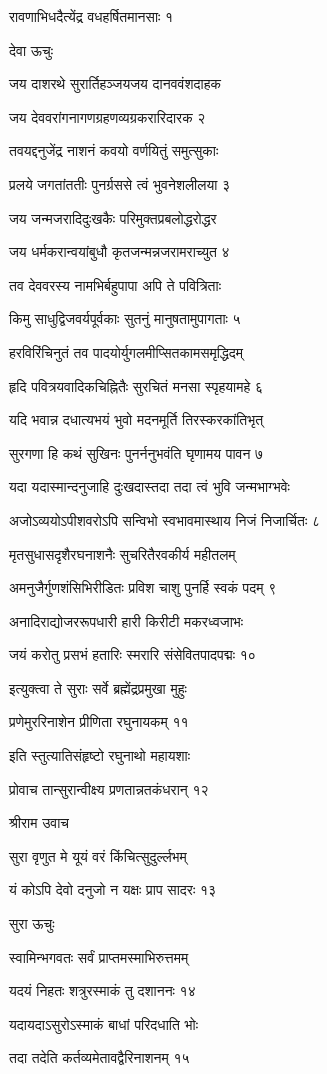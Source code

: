रावणाभिधदैत्येंद्र वधहर्षितमानसाः १

देवा ऊचुः

जय दाशरथे सुरार्तिहञ्जयजय दानववंशदाहक

जय देववरांगनागणग्रहणव्यग्रकरारिदारक २

तवयद्दनुजेंद्र नाशनं कवयो वर्णयितुं समुत्सुकाः

प्रलये जगतांततीः पुनर्ग्रससे त्वं भुवनेशलीलया ३

जय जन्मजरादिदुःखकैः परिमुक्तप्रबलोद्धरोद्धर

जय धर्मकरान्वयांबुधौ कृतजन्मन्नजरामराच्युत ४

तव देववरस्य नामभिर्बहुपापा अपि ते पवित्रिताः

किमु साधुद्विजवर्यपूर्वकाः सुतनुं मानुषतामुपागताः ५

हरविरिंचिनुतं तव पादयोर्युगलमीप्सितकामसमृद्धिदम्

हृदि पवित्रयवादिकचिह्नितैः सुरचितं मनसा स्पृहयामहे ६

यदि भवान्न दधात्यभयं भुवो मदनमूर्ति तिरस्करकांतिभृत्

सुरगणा हि कथं सुखिनः पुनर्ननुभवंति घृणामय पावन ७

यदा यदास्मान्दनुजाहि दुःखदास्तदा तदा त्वं भुवि जन्मभाग्भवेः

अजोऽव्ययोऽपीशवरोऽपि सन्विभो स्वभावमास्थाय निजं निजार्चितः ८

मृतसुधासदृशैरघनाशनैः सुचरितैरवकीर्य महीतलम्

अमनुजैर्गुणशंसिभिरीडितः प्रविश चाशु पुनर्हि स्वकं पदम् ९

अनादिराद्योजररूपधारी हारी किरीटी मकरध्वजाभः

जयं करोतु प्रसभं हतारिः स्मरारि संसेवितपादपद्मः १०

इत्युक्त्वा ते सुराः सर्वे ब्रह्मेंद्रप्रमुखा मुहुः

प्रणेमुररिनाशेन प्रीणिता रघुनायकम् ११

इति स्तुत्यातिसंहृष्टो रघुनाथो महायशाः

प्रोवाच तान्सुरान्वीक्ष्य प्रणतान्नतकंधरान् १२

श्रीराम उवाच

सुरा वृणुत मे यूयं वरं किंचित्सुदुर्ल्लभम्

यं कोऽपि देवो दनुजो न यक्षः प्राप सादरः १३

सुरा ऊचुः

स्वामिन्भगवतः सर्वं प्राप्तमस्माभिरुत्तमम्

यदयं निहतः शत्रुरस्माकं तु दशाननः १४

यदायदाऽसुरोऽस्माकं बाधां परिदधाति भोः

तदा तदेति कर्तव्यमेतावद्वैरिनाशनम् १५

